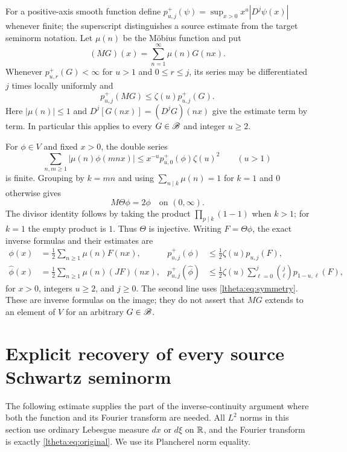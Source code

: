 \documentclass[11pt]{article}
\begin{document}
For a positive-axis smooth function define
$p^+_{u,j}(\psi)=\sup_{x>0}x^u|D^j\psi(x)|$ whenever finite;
the superscript distinguishes a source estimate from the target
seminorm notation. Let $\mu(n)$ be the M\"obius function and put
\[
 (MG)(x)=\sum_{n=1}^{\infty}\mu(n)G(nx).
\]
Whenever $p^+_{u,r}(G)<\infty$ for $u>1$ and $0\leq r\leq j$, its
series may be differentiated $j$ times locally uniformly and
\begin{equation}\label{ltheta:eq:mobius-bound}
 p^+_{u,j}(MG)\leq\zeta(u)p^+_{u,j}(G).
\end{equation}
Here $|\mu(n)|\leq1$ and $D^j[G(nx)]=(D^jG)(nx)$ give the estimate
term by term. In particular this applies to every $G\in\mathscr B$ and
integer $u\geq2$.

For $\phi\in V$ and fixed $x>0$, the double series
\[
 \sum_{n,m\geq1}|\mu(n)\phi(mnx)|
 \leq x^{-u}p^+_{u,0}(\phi)\zeta(u)^2
 \qquad(u>1)
\]
is finite. Grouping by $k=mn$ and using
$\sum_{n\mid k}\mu(n)=1$ for $k=1$ and $0$ otherwise gives
\begin{equation}\label{ltheta:eq:mobius-inversion}
 M\Theta\phi=2\phi\quad\text{on }(0,\infty).
\end{equation}
The divisor identity follows by taking the product
$\prod_{p\mid k}(1-1)$ when $k>1$; for $k=1$ the empty product is $1$.
Thus $\Theta$ is injective. Writing $F=\Theta\phi$, the exact inverse
formulas and their estimates are
\begin{align}
 \phi(x)&=\tfrac12\sum_{n\geq1}\mu(n)F(nx),&
 p^+_{u,j}(\phi)&\leq\tfrac12\zeta(u)p_{u,j}(F),
       \label{ltheta:eq:inverse-phi}\\
 \widehat\phi(x)&=\tfrac12\sum_{n\geq1}\mu(n)(JF)(nx),&
 p^+_{u,j}(\widehat\phi)&\leq\tfrac12\zeta(u)
                    \sum_{\ell=0}^j\binom j\ell p_{1-u,\ell}(F),
       \label{ltheta:eq:inverse-hat}
\end{align}
for $x>0$, integers $u\geq2$, and $j\geq0$. The second line uses
\eqref{ltheta:eq:symmetry}. These are inverse formulas on the image; they
do not assert that $MG$ extends to an element of $V$ for an arbitrary
$G\in\mathscr B$.

\section{Explicit recovery of every source Schwartz seminorm}

The following estimate supplies the part of the inverse-continuity
argument where both the function and its Fourier transform are needed.
All $L^2$ norms in this section use ordinary Lebesgue measure $dx$ or
$d\xi$ on $\mathbb R$, and the Fourier transform is exactly
\eqref{ltheta:eq:original}. We use its Plancherel norm equality.
\end{document}
